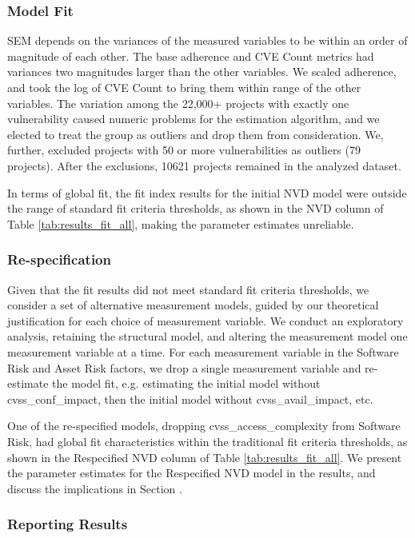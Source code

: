 \subsubsection{Model Fit}
SEM depends on the variances of the measured variables to be within an order of magnitude of each other. The base adherence and CVE Count metrics had variances two magnitudes larger than the other variables. We scaled adherence, and took the log of CVE Count to bring them within range of the other variables. The variation among the 22,000+ projects with exactly one vulnerability caused numeric problems for the estimation algorithm, and we elected to treat the group as outliers and drop them from consideration. We, further, excluded projects with 50 or more vulnerabilities as outliers (79 projects). After the exclusions, 10621 projects remained in the analyzed dataset. 

In terms of global fit, the fit index results for the initial NVD model were outside the range of standard fit criteria thresholds, as shown in the NVD column of Table \ref{tab:results_fit_all}, making the parameter estimates unreliable. 

\subsubsection{Re-specification}

Given that the fit results did not meet standard fit criteria thresholds, we consider a set of alternative measurement models, guided by our theoretical justification for each choice of measurement variable. We conduct an exploratory analysis, retaining the structural model, and altering the measurement model one measurement variable at a time. For each measurement variable in the Software Risk and Asset Risk factors, we drop a single measurement variable and re-estimate the model fit, e.g. estimating the initial model without cvss\_conf\_impact, then the initial model without cvss\_avail\_impact, etc. 

One of the re-specified models, dropping cvss\_access\_complexity from Software Risk, had global fit characteristics within the traditional fit criteria thresholds, as shown in the Respecified NVD column of Table \ref{tab:results_fit_all}. We present the parameter estimates for the Respecified NVD model in the results, and discuss the implications in Section \label{sec:case_nvd_discussion}.

\subsubsection{Reporting Results}
\label{sec:case_nvd_results}

